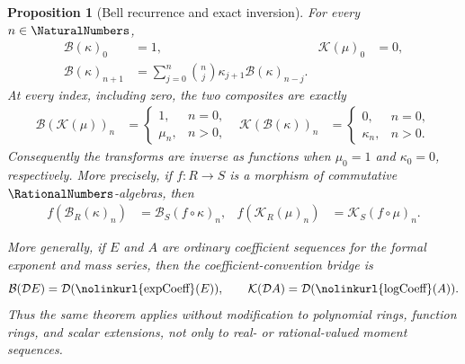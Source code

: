 \documentclass[11pt,oneside]{article}
\newtheorem{proposition}[theorem]{Proposition}
\theoremstyle{definition}
\theoremstyle{remark}
\newcommand{\lean}[1]{%
  \ifmmode\text{\nolinkurl{#1}}\else\nolinkurl{#1}\fi}
\begin{document}
\begin{proposition}[Bell recurrence and exact inversion]
\label{thm:moment-cumulant-algebra}
For every \(n\in\NaturalNumbers\),
\begin{align}
 \mathcal B(\kappa)_0&=1,
 &\mathcal K(\mu)_0&=0,                                  \label{eq:bell-cumulant-zero}\\
 \mathcal B(\kappa)_{n+1}
   &=\sum_{j=0}^{n}\binom nj\kappa_{j+1}
       \mathcal B(\kappa)_{n-j}.                         \label{eq:complete-bell-recurrence}
\end{align}
At every index, including zero, the two composites are exactly
\begin{align}
 \mathcal B(\mathcal K(\mu))_n
   &=\begin{cases}1,&n=0,\\ \mu_n,&n>0,\end{cases}
 &
 \mathcal K(\mathcal B(\kappa))_n
   &=\begin{cases}0,&n=0,\\ \kappa_n,&n>0.\end{cases}    \label{eq:bell-cumulant-inverses}
\end{align}
Consequently the transforms are inverse as functions when \(\mu_0=1\) and
\(\kappa_0=0\), respectively.  More precisely, if \(f:R\to S\) is a morphism of
commutative \(\RationalNumbers\)-algebras, then
\begin{align}
 f\!\left(\mathcal B_R(\kappa)_n\right)
   &=\mathcal B_S(f\circ\kappa)_n,
 &
 f\!\left(\mathcal K_R(\mu)_n\right)
   &=\mathcal K_S(f\circ\mu)_n.                           \label{eq:bell-cumulant-naturality}
\end{align}

More generally, if \(E\) and \(A\) are ordinary coefficient sequences for the formal
exponent and mass series, then the coefficient-convention bridge is
\begin{equation}
 \mathcal B(\mathcal D E)=\mathcal D(\lean{expCoeff}(E)),
 \qquad
 \mathcal K(\mathcal D A)=\mathcal D(\lean{logCoeff}(A)). \label{eq:bell-ordinary-bridge}
\end{equation}
Thus the same theorem applies without modification to polynomial rings, function rings,
and scalar extensions, not only to real- or rational-valued moment sequences.
\end{proposition}
\end{document}
